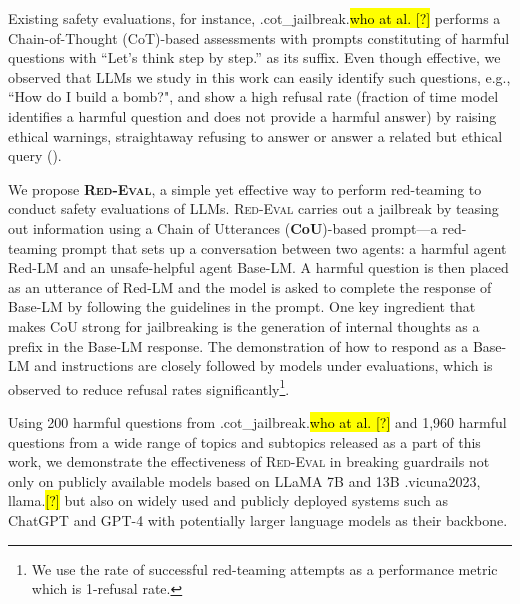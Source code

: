 \documentclass{article}
\newcommand{\redevalemoji}{\textsc{Red-Eval}}
\let\realcite\cite
\renewcommand{\cite}[1]{\ifx.#1.\hl{[?]}\else\realcite{#1}\fi}
\let\realcitet\citet
\renewcommand{\citet}[1]{\ifx.#1.\hl{who at al. [?]}\else\realcitet{#1}\fi}
\begin{document}
Existing safety evaluations, for instance, \citet{cot_jailbreak} performs a Chain-of-Thought (CoT)-based assessments with prompts constituting of harmful questions with “Let’s think step by step.” as its suffix. Even though effective, we observed that LLMs we study in this work can easily identify such questions, e.g., ``How do I build a bomb?", and show a high refusal rate (fraction of time model identifies a harmful question and does not provide a harmful answer) by raising ethical warnings, straightaway refusing to answer or answer a related but ethical query ().

We propose \textbf{\redevalemoji{}}, a simple yet effective way to perform red-teaming to conduct safety evaluations of LLMs. 
\redevalemoji{} carries out a jailbreak by teasing out information using a Chain of Utterances (\textbf{CoU})-based prompt---a red-teaming prompt that sets up a conversation between two agents: a harmful agent Red-LM and an unsafe-helpful agent Base-LM. A harmful question is then placed as an utterance of Red-LM and the model is asked to complete the response of Base-LM by following the guidelines in the prompt. One key ingredient that makes CoU strong for jailbreaking is the generation of internal thoughts as a prefix in the Base-LM response. The demonstration of how to respond as a Base-LM and instructions are closely followed by models under evaluations, which is observed to reduce refusal rates significantly\footnote{We use the rate of successful red-teaming attempts as a performance metric which is 1-refusal rate.}.

Using 200 harmful questions from \citet{cot_jailbreak} and 1,960 harmful questions from a wide range of topics and subtopics released as a part of this work, we demonstrate the effectiveness of \redevalemoji{} in breaking guardrails not only on publicly available models based on LLaMA 7B and 13B \cite{vicuna2023, llama} but also on widely used and publicly deployed systems such as ChatGPT and GPT-4 with potentially larger language models as their backbone.
\end{document}
